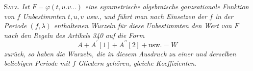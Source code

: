 \textsc{Satz.} \textit{Ist \(F=\varphi(t,\allowbreak u.v\ldots)\) eine symmetrische algebraische} \textit{ganzrationale Funktion von \(f\) Unbestimmten \(t,\allowbreak u,\allowbreak v\) usw., und führt man nach Einsetzen der \(f\) in der Periode \((f,\allowbreak \lambda)\) enthaltenen Wurzeln für diese Unbestimmten den Wert von \(F\) nach den Regeln des Artikels 340 auf die Form} \[A+A^{\prime}[1]+A^{\prime\prime}[2]+\text{usw.}=W\] \textit{zurück, so haben die Wurzeln, die in diesem Ausdruck zu einer und derselben beliebigen Periode mit \(f\) Gliedern gehören, gleiche Koeffizienten.}

